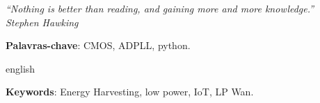 \begin{epigrafe}
    \vspace*{\fill}
	\begin{flushright}
		\textit{“Nothing is better than reading, and gaining more and more knowledge.”  \\
			Stephen Hawking
}
	\end{flushright}
\end{epigrafe}


\setlength{\absparsep}{18pt} %
\begin{resumo}
  
 \textbf{Palavras-chave}: CMOS, ADPLL, python.
\end{resumo}

\begin{resumo}[Abstract]
 \begin{otherlanguage*}{english}

   \vspace{\onelineskip}
 
   \noindent 
   \textbf{Keywords}: Energy Harvesting, low power, IoT, LP Wan.
 \end{otherlanguage*}
\end{resumo}


\listoffigures*
\cleardoublepage

\listofquadros*
\cleardoublepage

\listoftables*
\cleardoublepage

